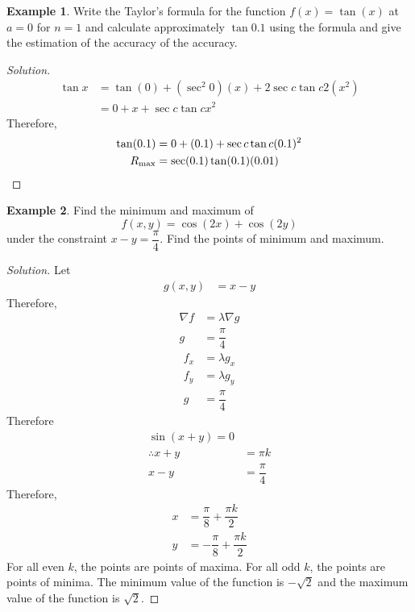 \documentclass[fleqn, a4paper, 12pt]{article}
\theoremstyle{definition}
\newtheorem{example}{Example}
\theoremstyle{theorem}
\theoremstyle{remark}
\newenvironment{solution}
{\begin{proof}[Solution]\let\qed\relax}
	{\end{proof}}
\begin{document}
\begin{example}
	Write the Taylor's formula for the function $f(x) = \tan (x)$ at $a = 0$ for $n = 1$ and calculate approximately $\tan 0.1$ using the formula and give the estimation of the accuracy of the accuracy.
\end{example}

\begin{solution}
	\begin{align*}
		\tan x &= \tan(0) + (\sec^2 0)(x) + {2 \sec c \tan c}{2}(x^2)\\
		&= 0 + x + \sec c \tan c x^2
	\end{align*}
	Therefore,
	\begin{align*}
		\tan (0.1) &= 0 + (0.1) + \sec c \tan c (0.1)^2\\
		R_{\textnormal{max}} &= \sec (0.1) \tan (0.1) (0.01)
	\end{align*}
\end{solution}

\begin{example}
	Find the minimum and maximum of
	\begin{equation*}
		f(x,y) = \cos (2x) + \cos (2y)
	\end{equation*}
	under the constraint $x - y = \dfrac{\pi}{4}$. Find the points of minimum and maximum.
\end{example}

\begin{solution}
	Let
	\begin{align*}
		g(x,y) &= x - y
	\end{align*}
	Therefore,
	\begin{align*}
		\nabla f &= \lambda \nabla g\\
		g &= \dfrac{\pi}{4}
	\end{align*}
	\begin{align*}
		f_x &= \lambda g_x\\
		f_y &= \lambda g_y\\
		g &= \dfrac{\pi}{4}
	\end{align*}
	Therefore
	\begin{align*}
		\sin (x + y) = 0\\
		\therefore x + y &= \pi k\\
		x - y &= \dfrac{\pi}{4}
	\end{align*}
	Therefore,
	\begin{align*}
		x &= \dfrac{\pi}{8} + \dfrac{\pi k}{2}\\
		y &= -\dfrac{\pi}{8} + \dfrac{\pi k}{2}
	\end{align*}
	For all even $k$, the points are points of maxima. For all odd $k$, the points are points of minima. The minimum value of the function is $-\sqrt{2}$ and the maximum value of the function is $\sqrt{2}$.
\end{solution}
\end{document}
